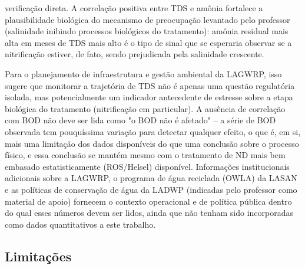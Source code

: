 verificação direta. A correlação positiva entre TDS e amônia fortalece a plausibilidade biológica do mecanismo de preocupação levantado pelo professor (salinidade inibindo processos biológicos do tratamento): amônia residual mais alta em meses de TDS mais alto é o tipo de sinal que se esperaria observar se a nitrificação estiver, de fato, sendo prejudicada pela salinidade crescente.

Para o planejamento de infraestrutura e gestão ambiental da LAGWRP, isso sugere que monitorar a trajetória de TDS não é apenas uma questão regulatória isolada, mas potencialmente um indicador antecedente de estresse sobre a etapa biológica do tratamento (nitrificação em particular). A ausência de correlação com BOD não deve ser lida como "o BOD não é afetado" -- a série de BOD observada tem pouquíssima variação para detectar qualquer efeito, o que é, em si, mais uma limitação dos dados disponíveis do que uma conclusão sobre o processo físico, e essa conclusão se mantém mesmo com o tratamento de ND mais bem embasado estatisticamente (ROS/Helsel) disponível. Informações institucionais adicionais sobre a LAGWRP, o programa de água reciclada (OWLA) da LASAN e as políticas de conservação de água da LADWP (indicadas pelo professor como material de apoio) fornecem o contexto operacional e de política pública dentro do qual esses números devem ser lidos, ainda que não tenham sido incorporadas como dados quantitativos a este trabalho.

\subsection{Limitações}

